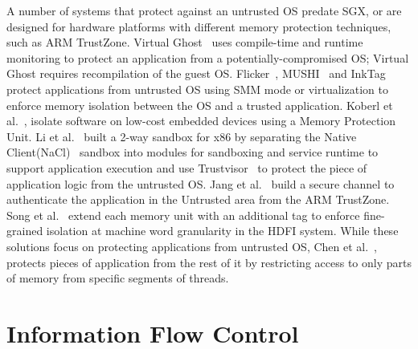 
A number of systems that protect against an untrusted OS predate SGX, or are designed for hardware platforms with different memory protection techniques, such as ARM TrustZone.
Virtual Ghost~\citep{criswell2014virtual} uses compile-time and runtime monitoring to protect an application
from a potentially-compromised OS; Virtual Ghost requires recompilation of the guest OS.
Flicker~\citep{flicker}, MUSHI~\citep{zhang2012mushi} and InkTag~\citep{inktag} protect applications from untrusted OS using SMM mode or virtualization
to enforce memory isolation between the OS and a trusted application.
Koberl et al.~\citep{koeberl2014trustlite}, isolate software on low-cost embedded devices using a Memory Protection Unit.
Li et al.~\citep{li2014minibox} built a 2-way sandbox for x86 by separating the Native Client(NaCl)~\citep{yee2009native} sandbox into modules for sandboxing and service runtime to support application execution and use Trustvisor~\citep{trustvisor} to protect the piece of application logic from the untrusted OS.
Jang et al.~\citep{jang2015secret} build a secure channel to authenticate the application in the Untrusted area from the ARM TrustZone.
Song et al.~\citep{songhdfi} extend each memory unit with an additional tag
to enforce fine-grained isolation at machine word granularity in the HDFI system.
While these solutions focus on protecting applications from untrusted OS, Chen et  al.~\citep{chenshreds}, protects pieces of application from the rest of it by restricting access to only parts of memory from specific segments of threads.



\section{Information Flow Control}

